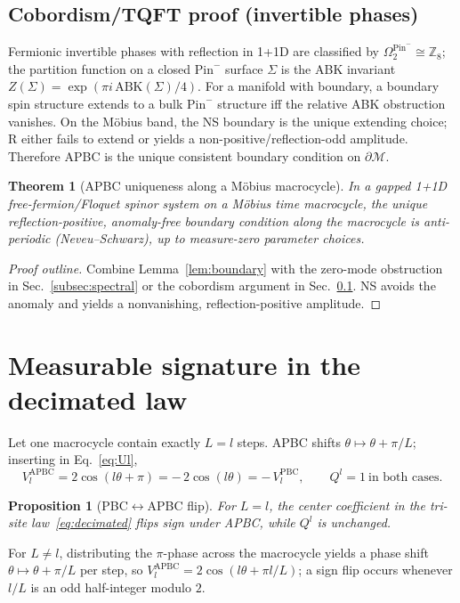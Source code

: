 \documentclass[aps,prb,twocolumn,superscriptaddress,nofootinbib,10pt]{revtex4-2}
\newtheorem{theorem}{Theorem}
\newtheorem{proposition}{Proposition}
\theoremstyle{definition}
\theoremstyle{remark}
\newcommand{\Z}{\mathbb{Z}}
\newcommand{\Pin}{\mathrm{Pin}}
\begin{document}
\subsection{Cobordism/TQFT proof (invertible phases)}\label{subsec:cobordism}
Fermionic invertible phases with reflection in 1+1D are classified by $\Omega^{\Pin^-}_2\cong \Z_8$; the partition function on a
closed $\Pin^{-}$ surface $\Sigma$ is the ABK invariant $Z(\Sigma)=\exp(\pi i\,\mathrm{ABK}(\Sigma)/4)$. For a manifold with
boundary, a boundary spin structure extends to a bulk $\Pin^{-}$ structure iff the relative ABK obstruction vanishes. On the
M\"obius band, the NS boundary is the unique extending choice; R either fails to extend or yields a non-positive/reflection-odd
amplitude. Therefore APBC is the unique consistent boundary condition on $\partial\mathcal{M}$.

\begin{theorem}[APBC uniqueness along a M\"obius macrocycle]\label{thm:APBC}
In a gapped 1+1D free-fermion/Floquet spinor system on a M\"obius time macrocycle, the unique reflection-positive,
anomaly-free boundary condition along the macrocycle is anti-periodic (Neveu--Schwarz), up to measure-zero parameter choices.
\end{theorem}
\begin{proof}[Proof outline]
Combine Lemma~\ref{lem:boundary} with the zero-mode obstruction in Sec.~\ref{subsec:spectral} or the cobordism argument in
Sec.~\ref{subsec:cobordism}. NS avoids the anomaly and yields a nonvanishing, reflection-positive amplitude.
\end{proof}

\section{Measurable signature in the decimated law}
Let one macrocycle contain exactly $L=l$ steps. APBC shifts $\theta\mapsto \theta+\pi/L$; inserting in Eq.~\eqref{eq:Ul},
\begin{equation}\label{eq:flip}
V_l^{\mathrm{APBC}}=2\cos(l\theta+\pi)=-\,2\cos(l\theta)=-\,V_l^{\mathrm{PBC}},\qquad Q^l=1\ \text{in both cases}.
\end{equation}
\begin{proposition}[PBC$\leftrightarrow$APBC flip]\label{prop:flip}
For $L=l$, the center coefficient in the tri-site law~\eqref{eq:decimated} flips sign under APBC, while $Q^l$ is unchanged.
\end{proposition}
For $L\neq l$, distributing the $\pi$-phase across the macrocycle yields a phase shift $\theta\mapsto\theta+\pi/L$ per step,
so $V_l^{\mathrm{APBC}}=2\cos(l\theta+\pi l/L)$; a sign flip occurs whenever $l/L$ is an odd half-integer modulo $2$.
\end{document}
